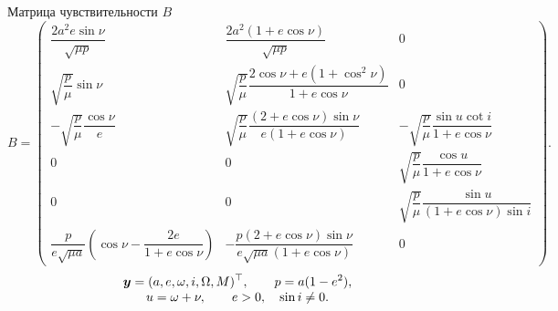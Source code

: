\documentclass[11pt,aspectratio=169,t]{beamer}
\newcommand{\eqcompact}{\fontsize{10}{12}\selectfont}
\newcommand{\derivationmathspacing}{%
  \setlength{\abovedisplayskip}{2pt}%
  \setlength{\belowdisplayskip}{3pt}%
  \setlength{\abovedisplayshortskip}{2pt}%
  \setlength{\belowdisplayshortskip}{2pt}%
  \setlength{\jot}{2pt}}
\newcommand{\vect}[1]{\boldsymbol{#1}}
\begin{document}
\begin{frame}{Матрица чувствительности $B$}
\relax
\derivationmathspacing
{\fontsize{9.2}{10.5}\selectfont\derivationmathspacing
\setlength{\arraycolsep}{3pt}
\[
 B=\begin{pmatrix}
 \dfrac{2a^2e\sin\nu}{\sqrt{\mu p}}&
 \dfrac{2a^2(1+e\cos\nu)}{\sqrt{\mu p}}&0\\[1pt]
 \sqrt{\dfrac p\mu}\sin\nu&
 \sqrt{\dfrac p\mu}\dfrac{2\cos\nu+e(1+\cos^2\nu)}{1+e\cos\nu}&0\\[1pt]
 -\sqrt{\dfrac p\mu}\dfrac{\cos\nu}{e}&
 \sqrt{\dfrac p\mu}\dfrac{(2+e\cos\nu)\sin\nu}{e(1+e\cos\nu)}&
 -\sqrt{\dfrac p\mu}\dfrac{\sin u\cot i}{1+e\cos\nu}\\[1pt]
 0&0&\sqrt{\dfrac p\mu}\dfrac{\cos u}{1+e\cos\nu}\\[1pt]
 0&0&\sqrt{\dfrac p\mu}\dfrac{\sin u}{(1+e\cos\nu)\sin i}\\[1pt]
 \dfrac{p}{e\sqrt{\mu a}}\left(\cos\nu-\dfrac{2e}{1+e\cos\nu}\right)&
 -\dfrac{p(2+e\cos\nu)\sin\nu}{e\sqrt{\mu a}(1+e\cos\nu)}&0
 \end{pmatrix}.
\]
}
{\eqcompact
\[
 \begingroup\setlength{\jot}{0pt}\begin{gathered}
 \vect y=(a,e,\omega,i,\Omega,M)^\top,\qquad p=a(1-e^2),\\
 u=\omega+\nu,\qquad e>0,\quad\sin i\ne0.
 \end{gathered}\endgroup
\]
}
\end{frame}
\end{document}
